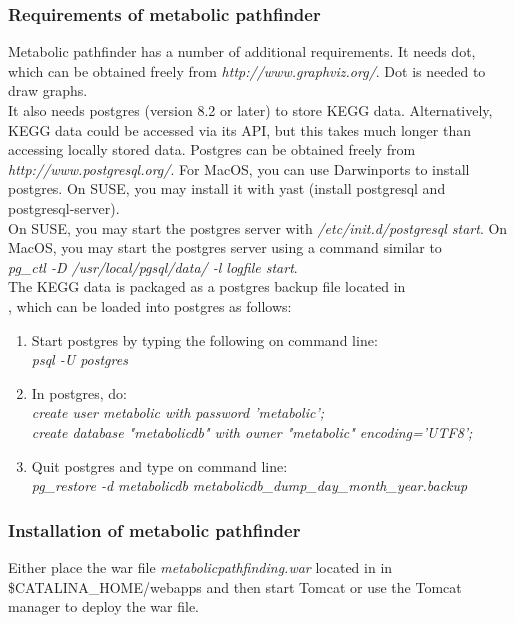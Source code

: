 \documentclass{book}
\begin{document}
\subsubsection{Requirements of metabolic pathfinder}

Metabolic pathfinder has a number of additional requirements.
It needs dot, which can be obtained freely from \textit{http://www.graphviz.org/}.
Dot is needed to draw graphs.\\

It also needs postgres (version 8.2 or later) to store KEGG data.
Alternatively, KEGG data could be accessed via its API,
but this takes much longer than accessing locally stored data.
Postgres can be obtained freely from
\textit{http://www.postgresql.org/}.
For MacOS, you can use Darwinports to install postgres. On SUSE, you may
install it with yast (install postgresql and postgresql-server).\\

On SUSE, you may start the postgres server with
\textit{/etc/init.d/postgresql start}. On MacOS, you may start the postgres server
using a command similar to\\
\textit{pg\_ctl -D /usr/local/pgsql/data/ -l logfile start}.\\

The KEGG data is packaged as a postgres backup file located in\\
,
which can be loaded into postgres as follows:
\begin{enumerate}
\item Start postgres by typing the following on command line:\\
\textit{psql -U postgres}
\item In postgres, do:\\
\textit{create user metabolic with password 'metabolic';}\\
\textit{create database "metabolicdb" with owner "metabolic" encoding='UTF8';}
\item Quit postgres and type on command line:\\
\textit{pg\_restore -d metabolicdb metabolicdb\_dump\_day\_month\_year.backup}
\end{enumerate}

\subsubsection{Installation of metabolic pathfinder}
Either place the war file \textit{metabolicpathfinding.war} located
in  in\\
\$CATALINA\_HOME/webapps and then start
Tomcat or use the Tomcat manager to deploy the war file.
\end{document}
